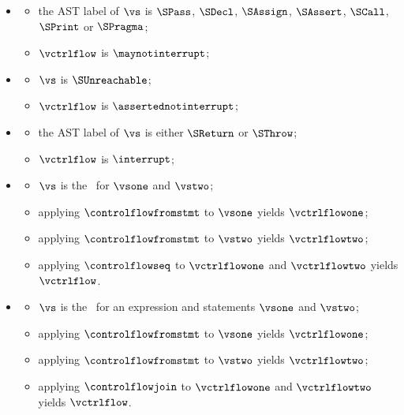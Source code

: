 \ProseParagraph
\OneApplies
\begin{itemize}
  \item {}
  \begin{itemize}
    \item the AST label of $\vs$ is $\SPass$, $\SDecl$, $\SAssign$, $\SAssert$, $\SCall$, $\SPrint$ or $\SPragma$;
    \item $\vctrlflow$ is $\maynotinterrupt$;
  \end{itemize}

  \item {}
  \begin{itemize}
    \item $\vs$ is $\SUnreachable$;
    \item $\vctrlflow$ is $\assertednotinterrupt$;
  \end{itemize}

  \item {}
  \begin{itemize}
    \item the AST label of $\vs$ is either $\SReturn$ or $\SThrow$;
    \item $\vctrlflow$ is $\interrupt$;
  \end{itemize}

  \item {}
  \begin{itemize}
    \item $\vs$ is the \sequencingstatementterm\ for $\vsone$ and $\vstwo$;
    \item applying $\controlflowfromstmt$ to $\vsone$ yields $\vctrlflowone$;
    \item applying $\controlflowfromstmt$ to $\vstwo$ yields $\vctrlflowtwo$;
    \item applying $\controlflowseq$ to $\vctrlflowone$ and $\vctrlflowtwo$ yields $\vctrlflow$.
  \end{itemize}

  \item {}
  \begin{itemize}
    \item $\vs$ is the \conditionalstatementterm\ for an expression and statements $\vsone$ and $\vstwo$;
    \item applying $\controlflowfromstmt$ to $\vsone$ yields $\vctrlflowone$;
    \item applying $\controlflowfromstmt$ to $\vstwo$ yields $\vctrlflowtwo$;
    \item applying $\controlflowjoin$ to $\vctrlflowone$ and $\vctrlflowtwo$ yields $\vctrlflow$.
  \end{itemize}


\end{itemize}
